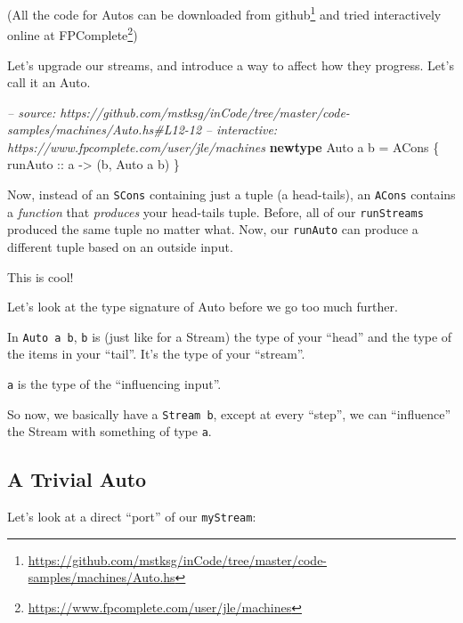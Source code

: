 \documentclass[]{article}
\newenvironment{Shaded}{}{}
\newcommand{\KeywordTok}[1]{\textcolor[rgb]{0.00,0.44,0.13}{\textbf{{#1}}}}
\newcommand{\DataTypeTok}[1]{\textcolor[rgb]{0.56,0.13,0.00}{{#1}}}
\newcommand{\CommentTok}[1]{\textcolor[rgb]{0.38,0.63,0.69}{\textit{{#1}}}}
\newcommand{\OtherTok}[1]{\textcolor[rgb]{0.00,0.44,0.13}{{#1}}}
\newcommand{\FunctionTok}[1]{\textcolor[rgb]{0.02,0.16,0.49}{{#1}}}
\newcommand{\NormalTok}[1]{{#1}}
\renewcommand{\href}[2]{#2\footnote{\url{#1}}}
\begin{document}
(All the code for Autos can be downloaded
\href{https://github.com/mstksg/inCode/tree/master/code-samples/machines/Auto.hs}{from
github} and tried interactively online
\href{https://www.fpcomplete.com/user/jle/machines}{at FPComplete})

Let's upgrade our streams, and introduce a way to affect how they
progress. Let's call it an Auto.

\begin{Shaded}
\begin{Highlighting}[]
\CommentTok{-- source: https://github.com/mstksg/inCode/tree/master/code-samples/machines/Auto.hs#L12-12}
\CommentTok{-- interactive: https://www.fpcomplete.com/user/jle/machines}
\KeywordTok{newtype} \DataTypeTok{Auto} \NormalTok{a b }\FunctionTok{=} \DataTypeTok{ACons} \NormalTok{\{}\OtherTok{ runAuto ::} \NormalTok{a }\OtherTok{->} \NormalTok{(b, }\DataTypeTok{Auto} \NormalTok{a b) \}}
\end{Highlighting}
\end{Shaded}

Now, instead of an \texttt{SCons} containing just a tuple (a
head-tails), an \texttt{ACons} contains a \emph{function} that
\emph{produces} your head-tails tuple. Before, all of our
\texttt{runStreams} produced the same tuple no matter what. Now, our
\texttt{runAuto} can produce a different tuple based on an outside
input.

This is cool!

Let's look at the type signature of Auto before we go too much further.

In \texttt{Auto\ a\ b}, \texttt{b} is (just like for a Stream) the type
of your ``head'' and the type of the items in your ``tail''. It's the
type of your ``stream''.

\texttt{a} is the type of the ``influencing input''.

So now, we basically have a \texttt{Stream\ b}, except at every
``step'', we can ``influence'' the Stream with something of type
\texttt{a}.

\subsection{A Trivial Auto}\label{a-trivial-auto}

Let's look at a direct ``port'' of our \texttt{myStream}:
\end{document}

